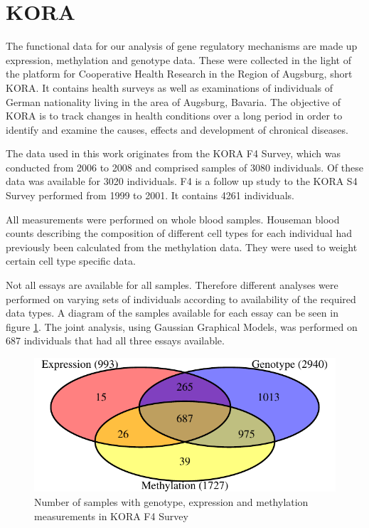 \documentclass[a4paper,12pt,twoside,openright]{report}
\begin{document}
\section{KORA}
\label{Data:KORA}
The functional data for our analysis of gene regulatory mechanisms are made up expression, methylation and genotype data. These were collected in the light of the platform for Cooperative Health Research in the Region of Augsburg, short KORA. It contains health surveys as well as examinations of individuals of German nationality living in the area of Augsburg, Bavaria.
The objective of KORA is to track changes in health conditions over a long period in order to identify and examine the causes, effects and development of chronical diseases.

The data used in this work originates from the KORA F4 Survey, which was conducted from 2006 to 2008 and comprised samples of 3080 individuals. Of these data was available for 3020 individuals. F4 is a follow up study to the KORA S4 Survey performed from 1999 to 2001. It contains 4261 individuals. 

All measurements were performed on whole blood samples. Houseman blood counts\cite{10.3389/fgene.2016.00023} describing the composition of different cell types for each individual had previously been calculated from the methylation data. They were used to weight certain cell type specific data. 

Not all essays are available for all samples. Therefore different analyses were performed on varying sets of individuals according to availability of the required data types. A diagram of the samples available for each essay can be seen in figure \ref{fig:samples.venn}. The joint analysis, using Gaussian Graphical Models, was performed on 687 individuals that had all three essays available. 
\begin{figure}[tb]
\begin{center}
	\includegraphics[scale = 1, keepaspectratio = true]{../figures/samples_venn}  
	\caption{Number of samples with genotype, expression and methylation measurements in KORA F4 Survey}
    \label{fig:samples.venn}
\end{center}
\end{figure}
\end{document}
